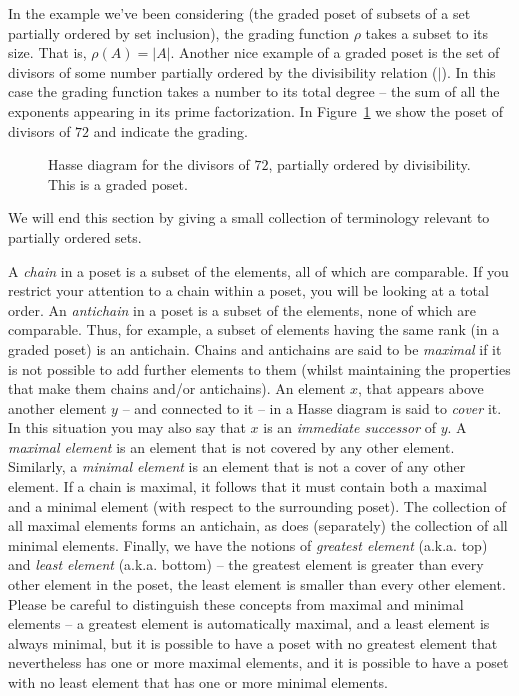 In the example we've been considering (the graded poset of subsets of a set
partially ordered by set inclusion), the grading function $\rho$ takes a
subset to its size.  That is, $\rho(A) = |A|$.  Another nice example of
a graded poset is the set of divisors of some number partially ordered
by the divisibility relation ($\mid$).  In this case the grading function
takes a number to its total degree -- the sum of all the exponents
appearing in its prime factorization.  In Figure~\ref{fig:divisors_of_72}
we show the poset of divisors of $72$ and indicate the grading.

\begin{figure}[!hbtp]

\caption[Hasse diagram of divisors of 72.]{Hasse %
diagram for the divisors of $72$, partially ordered by %
divisibility.  This is a graded poset.}
\label{fig:divisors_of_72} 
\end{figure}

We will end this section by giving a small collection of terminology
relevant to partially ordered sets.

A \emph{chain} in a poset is a subset of the elements, all 
of which are comparable.  If you restrict your attention to a chain within 
a poset, you will be looking at a total order.  
An \emph{antichain} in a poset is a subset
of the elements, none of which are comparable.  Thus, for example, a subset
of elements having the same rank (in a graded poset) is an antichain.  
Chains and antichains are said to be \emph{maximal} if it
is not possible to add further elements to them (whilst maintaining the 
properties that make them chains and/or antichains).  An element $x$, that 
appears above another element $y$ -- and connected to it -- in a Hasse
diagram is said to \emph{cover} it.  In this situation
you may also say that $x$ is an \emph{immediate successor} of
$y$.  A \emph{maximal element} is an element that is not covered by any other element.  Similarly, a 
\emph{minimal element} is an element that is not a cover of any other element.  If a chain is maximal, it follows that it
must contain both a maximal and a minimal element (with respect to the
surrounding poset).  The collection of all maximal elements forms an antichain,
as does (separately) the collection of all minimal elements.  Finally,
we have the notions of  
\emph{greatest element} (a.k.a. top) and 
\emph{least element} (a.k.a. 
bottom) -- the greatest element is greater than every
other element in the poset,  the least element is smaller than every other element.  Please be careful to distinguish these
concepts from maximal and minimal elements -- a greatest element is 
automatically maximal, and a least element is always minimal, but it 
is possible to have a poset with no greatest element that nevertheless 
has one or more maximal elements, and it is possible to have a poset with no
least element that has one or more minimal elements. 


